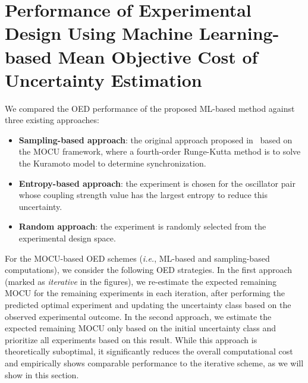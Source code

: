 \documentclass{article}
\begin{document}
\section{Performance of Experimental Design Using Machine Learning-based Mean Objective Cost of Uncertainty Estimation}
\label{sec:oed_ml}
We compared the OED performance of the proposed ML-based method against three existing approaches:
\begin{itemize}
    \item \textbf{Sampling-based approach}: the original approach proposed in~\cite{Hong2021} based on the MOCU framework, where a fourth-order Runge-Kutta method is to solve the Kuramoto model to determine synchronization.
    \item \textbf{Entropy-based approach}: the experiment is chosen for the oscillator pair whose coupling strength value has the largest entropy to reduce this uncertainty.
    \item \textbf{Random approach}: the experiment is randomly selected from the experimental design space. 
\end{itemize}
For the MOCU-based OED schemes (\textit{i.e.}, ML-based and sampling-based computations), we consider the following OED strategies. In the first approach (marked as \textit{iterative} in the figures), we re-estimate the expected remaining MOCU for the remaining experiments in each iteration, after performing the predicted optimal experiment and updating the uncertainty class based on the observed experimental outcome. In the second approach, we estimate the expected remaining MOCU only based on the initial uncertainty class and prioritize all experiments based on this result. While this approach is theoretically suboptimal, it significantly reduces the overall computational cost and empirically shows comparable performance to the iterative scheme, as we will show in this section.
\end{document}
